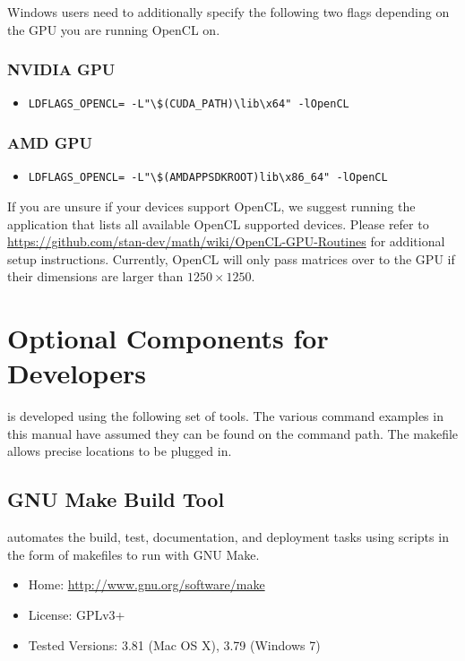 Windows users need to additionally specify the following two flags depending on the GPU you are running OpenCL on.

\subsubsection{NVIDIA GPU}
\begin{itemize}
  \item \Verb|LDFLAGS_OPENCL= -L"\$(CUDA_PATH)\lib\x64" -lOpenCL|
\end{itemize}

\subsubsection{AMD GPU}
\begin{itemize}
  \item \Verb|LDFLAGS_OPENCL= -L"\$(AMDAPPSDKROOT)lib\x86_64" -lOpenCL|
\end{itemize}

If you are unsure if your devices support OpenCL, we suggest running the  application that lists all available OpenCL supported devices. Please refer to \url{https://github.com/stan-dev/math/wiki/OpenCL-GPU-Routines} for additional setup instructions. Currently, OpenCL will only pass matrices over to the GPU if their dimensions are larger than $1250\times 1250$.

\section{Optional Components for Developers}

\CmdStan is developed using the following set of tools.  The various
command examples in this manual have assumed they can be found on
the command path.  The makefile allows precise locations to be plugged
in.

\subsection{GNU Make Build Tool}

\CmdStan automates the build, test, documentation, and deployment tasks
using scripts in the form of makefiles to run with GNU Make.
%
\begin{itemize}
\item Home: \url{http://www.gnu.org/software/make}
\item License: GPLv3+
\item Tested Versions: 3.81 (Mac OS X), 3.79 (Windows 7)
\end{itemize}
%



